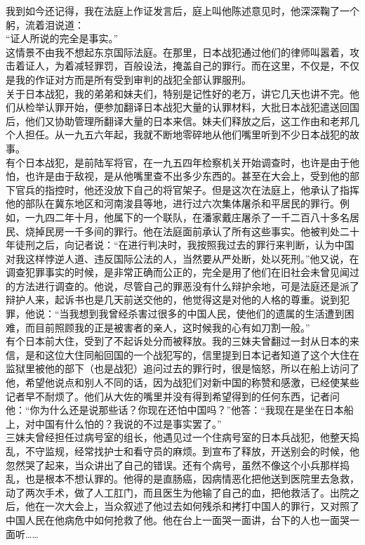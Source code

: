 我到如今还记得，我在法庭上作证发言后，庭上叫他陈述意见时，他深深鞠了一个躬，流着泪说道：\\

“证人所说的完全是事实。”\\

这情景不由我不想起东京国际法庭。在那里，日本战犯通过他们的律师叫嚣着，攻击着证人，为着减轻罪罚，百般设法，掩盖自己的罪行。而在这里，不仅是，不仅是我的作证对方而是所有受到审判的战犯全部认罪服刑。\\

关于日本战犯，我的弟弟和妹夫们，特别是记性好的老万，讲它几天也讲不完。他们从检举认罪开始，便参加翻译日本战犯大量的认罪材料，大批日本战犯遣送回国后，他们又协助管理所翻译大量的日本来信。妹夫们释放之后，这工作由和老邦几个人担任。从一九五六年起，我就不断地零碎地从他们嘴里听到不少日本战犯的故事。\\

有个日本战犯，是前陆军将官，在一九五四年检察机关开始调查时，也许是由于他怕，也许是由于敌视，是从他嘴里查不出多少东西的。甚至在大会上，受到他的部下官兵的指控时，他还没放下自己的将官架子。但是这次在法庭上，他承认了指挥他的部队在冀东地区和河南浚县等地，进行过六次集体屠杀和平居民的罪行。例如，一九四二年十月，他属下的一个联队，在潘家戴庄屠杀了一千二百八十多名居民、烧掉民房一千多间的罪行。他在法庭面前承认了所有这些事实。他被判处二十年徒刑之后，向记者说：“在进行判决时，我按照我过去的罪行来判断，认为中国对我这样悖逆人道、违反国际公法的人，当然要从严处断，处以死刑。”他又说，在调查犯罪事实的时候，是非常正确而公正的，完全是用了他们在旧社会未曾见闻过的方法进行调查的。他说，尽管自己的罪恶没有什么辩护余地，可是法庭还是派了辩护人来，起诉书也是几天前送交他的，他觉得这是对他的人格的尊重。说到犯罪，他说：“当我想到我曾经杀害过很多的中国人民，使他们的遗属的生活遭到困难，而目前照顾我的正是被害者的亲人，这时候我的心有如刀割一般。”\\

有个日本前大住，受到了不起诉处分而被释放。我的三妹夫曾翻过一封从日本的来信，是和这位大住同船回国的一个战犯写的，信里提到日本记者知道了这个大住在监狱里被他的部下（也是战犯）追问过去的罪行时，很是恼怒，所以在船上访问了他，希望他说点和别人不同的话，因为战犯们对新中国的称赞和感激，已经使某些记者早不耐烦了。他们从大佐的嘴里并没有得到希望得到的任何东西，记者问他：“你为什么还是说那些话？你现在还怕中国吗？”他答：“我现在是坐在日本船上，对中国有什么怕的？我说的不过是事实罢了。”\\

三妹夫曾经担任过病号室的组长，他遇见过一个住病号室的日本兵战犯，他整天捣乱，不守监规，经常找护士和看守员的麻烦。到宣布了释放，开送别会的时候，他忽然哭了起来，当众讲出了自己的错误。还有个病号，虽然不像这个小兵那样捣乱，也是根本不想认罪的。他得的是直肠癌，因病情恶化把他送到医院里去急救，动了两次手术，做了人工肛门，而且医生为他输了自己的血，把他救活了。出院之后，他在一次大会上，当众叙述了他过去如何残杀和拷打中国人的罪行，又对照了中国人民在他病危中如何抢救了他。他在台上一面哭一面讲，台下的人也一面哭一面听……\\

